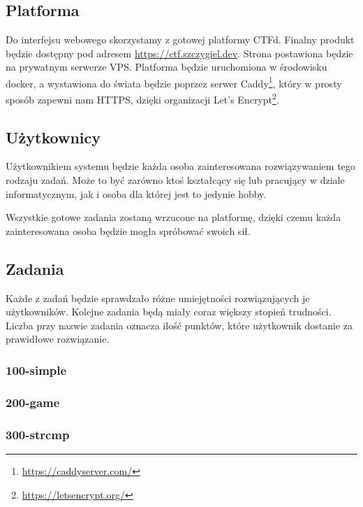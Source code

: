 \documentclass[polish,12pt]{aghthesis}
\begin{document}
\section{\SectionTitleScope}
\label{sec:zakres-funkcjonalnosci}

\subsection{Platforma}

Do interfejsu webowego skorzystamy z gotowej platformy CTFd.
Finalny produkt będzie dostępny pod adresem
\href{https://ctf.szczygiel.dev}{https://ctf.szczygiel.dev}.
Strona postawiona będzie na prywatnym serwerze VPS. Platforma będzie
uruchomiona w środowisku docker, a wystawiona do świata będzie poprzez serwer
Caddy\footnote{\url{https://caddyserver.com/}}, który w prosty sposób zapewni nam HTTPS,
dzięki organizacji Let's Encrypt\footnote{\url{https://letsencrypt.org/}}.

\subsection{Użytkownicy}

Użytkownikiem systemu będzie każda osoba zainteresowana rozwiązywaniem
tego rodzaju zadań. Może to być zarówno ktoś kształcący się lub pracujący
w dziale informatycznym, jak i osoba dla której jest to jedynie hobby.

Wszystkie gotowe zadania zostaną wrzucone na platformę, dzięki czemu
każda zainteresowana osoba będzie mogła spróbować swoich sił.

\subsection{Zadania}

Każde z zadań będzie sprawdzało różne umiejętności rozwiązujących je użytkowników.
Kolejne zadania będą miały coraz większy stopień trudności. Liczba przy nazwie zadania
oznacza ilość punktów, które użytkownik dostanie za prawidłowe rozwiązanie.

\subsubsection{100-simple}
\subsubsection{200-game}
\subsubsection{300-strcmp}
\end{document}
